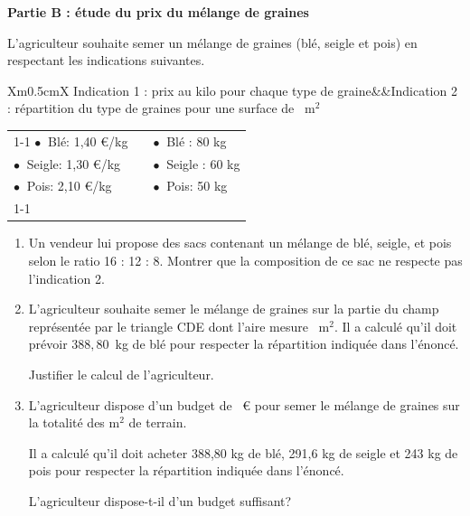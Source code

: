 \documentclass[exercice,a4]{thedocument}%
\begin{document}
\medskip

\textbf{Partie B : étude du prix du mélange de graines}

\medskip

L'agriculteur souhaite semer un mélange de graines (blé, seigle et pois) en respectant les indications suivantes.

\medskip

\begin{tabularx}{\linewidth}{Xm{0.5cm}X}
Indication 1 : prix au kilo pour chaque type de graine&&Indication 2 : répartition du type de graines pour une surface de ~m$^2$\\
\end{tabularx}
\begin{tabularx}{\linewidth}{|X|m{0.5cm}|X|}\cline{1-1}\cline{3-3}
$\bullet~$ Blé: 1,40 \euro/kg		&	&$\bullet~$ Blé : 80 kg\\ 
$\bullet~$ Seigle: 1,30 \euro/kg	&	&$\bullet~$ Seigle : 60 kg\\
$\bullet~$ Pois: 2,10 \euro/kg		&	&$\bullet~$ Pois: 50 kg\\ \cline{1-1}\cline{3-3}
\end{tabularx}

\medskip

\begin{enumerate}
\item Un vendeur lui propose des sacs contenant un mélange de blé, seigle, et pois selon le ratio 16 : 12 : 8. Montrer que la composition de ce sac ne respecte pas l'indication 2.
\item L'agriculteur souhaite semer le mélange de graines sur la partie du champ représentée par le triangle CDE dont l'aire mesure ~m$^2$. Il a calculé qu'il doit prévoir $388,80$~kg de blé pour respecter la répartition indiquée dans l'énoncé.

Justifier le calcul de l'agriculteur.
\item L'agriculteur dispose d'un budget de ~\euro{} pour semer le mélange de graines sur la totalité des  m$^2$ de terrain.

Il a calculé qu'il doit acheter 388,80 kg de blé, 291,6 kg de seigle et 243 kg de pois pour respecter la répartition indiquée dans l'énoncé.

L'agriculteur dispose-t-il d'un budget suffisant?
\end{enumerate}

\bigskip
\showthesource
\end{document}
